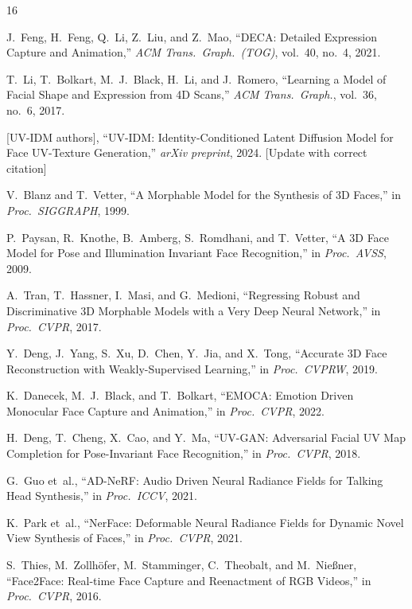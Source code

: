 \documentclass[conference]{IEEEtran}
\begin{document}
\begin{thebibliography}{16}

J.~Feng, H.~Feng, Q.~Li, Z.~Liu, and Z.~Mao,
``DECA: Detailed Expression Capture and Animation,''
\emph{ACM Trans.\ Graph.\ (TOG)}, vol.~40, no.~4, 2021.

T.~Li, T.~Bolkart, M.~J.~Black, H.~Li, and J.~Romero,
``Learning a Model of Facial Shape and Expression from 4D Scans,''
\emph{ACM Trans.\ Graph.}, vol.~36, no.~6, 2017.

[UV-IDM authors],
``UV-IDM: Identity-Conditioned Latent Diffusion Model for Face UV-Texture
Generation,''
\emph{arXiv preprint}, 2024.
[Update with correct citation]

V.~Blanz and T.~Vetter,
``A Morphable Model for the Synthesis of 3D Faces,''
in \emph{Proc.\ SIGGRAPH}, 1999.

P.~Paysan, R.~Knothe, B.~Amberg, S.~Romdhani, and T.~Vetter,
``A 3D Face Model for Pose and Illumination Invariant Face Recognition,''
in \emph{Proc.\ AVSS}, 2009.

A.~Tran, T.~Hassner, I.~Masi, and G.~Medioni,
``Regressing Robust and Discriminative 3D Morphable Models with a Very Deep
Neural Network,''
in \emph{Proc.\ CVPR}, 2017.

Y.~Deng, J.~Yang, S.~Xu, D.~Chen, Y.~Jia, and X.~Tong,
``Accurate 3D Face Reconstruction with Weakly-Supervised Learning,''
in \emph{Proc.\ CVPRW}, 2019.

K.~Danecek, M.~J.~Black, and T.~Bolkart,
``EMOCA: Emotion Driven Monocular Face Capture and Animation,''
in \emph{Proc.\ CVPR}, 2022.

H.~Deng, T.~Cheng, X.~Cao, and Y.~Ma,
``UV-GAN: Adversarial Facial UV Map Completion for Pose-Invariant Face
Recognition,''
in \emph{Proc.\ CVPR}, 2018.

G.~Guo et~al.,
``AD-NeRF: Audio Driven Neural Radiance Fields for Talking Head Synthesis,''
in \emph{Proc.\ ICCV}, 2021.

K.~Park et~al.,
``NerFace: Deformable Neural Radiance Fields for Dynamic Novel View Synthesis
of Faces,''
in \emph{Proc.\ CVPR}, 2021.

S.~Thies, M.~Zollh\"ofer, M.~Stamminger, C.~Theobalt, and M.~Nie{\ss}ner,
``Face2Face: Real-time Face Capture and Reenactment of RGB Videos,''
in \emph{Proc.\ CVPR}, 2016.


\end{thebibliography}
\end{document}
